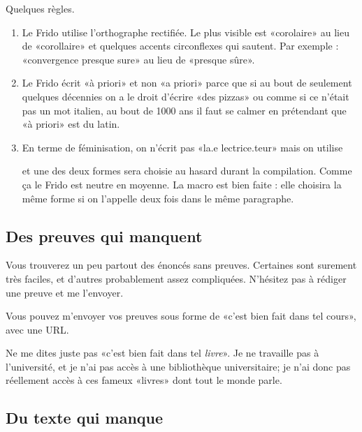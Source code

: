 Quelques règles.
\begin{enumerate}
	\item
	      Le Frido utilise l'orthographe rectifiée. Le plus visible est «corolaire» au lieu de «corollaire» et quelques accents circonflexes qui sautent. Par exemple : «convergence presque sure» au lieu de «presque sûre».
	\item
	      Le Frido écrit «à priori» et non «a priori» parce que si au bout de seulement quelques décennies on a le droit d'écrire «des pizzas» ou comme si ce n'était pas un mot italien, au bout de 1000 ans il faut se calmer en prétendant que «à priori» est du latin.
	\item
	      En terme de féminisation, on n'écrit pas «la.e lectrice.teur» mais on utilise
	      \begin{center}
	      \end{center}
	      et une des deux formes sera choisie au hasard durant la compilation. Comme ça le Frido est neutre en moyenne. La macro est bien faite : elle choisira la même forme si on l'appelle deux fois dans le même paragraphe.
\end{enumerate}


\subsection{Des preuves qui manquent}
\label{SUBooINTROhowtoContribProofs}

Vous trouverez un peu partout des énoncés sans preuves. Certaines sont surement très faciles, et d'autres probablement assez compliquées. N'hésitez pas à rédiger une preuve et me l'envoyer.

Vous pouvez m'envoyer vos preuves sous forme de «c'est bien fait dans tel cours», avec une URL.

Ne me dites juste pas «c'est bien fait dans tel \emph{livre}». Je ne travaille pas à l'université, et je n'ai pas accès à une bibliothèque universitaire; je n'ai donc pas réellement accès à ces fameux «livres» dont tout le monde parle.

\subsection{Du texte qui manque}
\label{SUBooINTROhowtoContribText}

